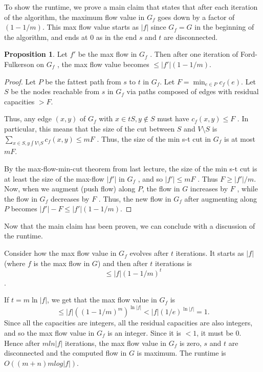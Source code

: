 \documentclass [12pt]{article}
\theoremstyle{definition}
\newtheorem{proposition}{Proposition}
\begin{document}
To show the runtime, we prove a main claim that states that after each iteration of the algorithm, the maximum flow value in $G_f$ goes down by a factor of $(1-1/m)$. This max flow value starts as $|f |$ since $G_f = G$ in the beginning of the algorithm, and ends at $0$ as in the end $s$ and $t$ are disconnected. 

\begin{proposition}
Let $f'$ be the max flow in $G_f$ . Then after one iteration of Ford-Fulkerson on $G_f$ , the max flow value becomes $\leq |f' |(1 - 1/m)$.
\end{proposition}


\begin{proof}

Let $P$ be the fattest path from $s$ to $t$ in $G_f$. Let $F = \min_{e \in P} c_f (e)$. Let $S$ be the nodes reachable from $s$ in $G_f$ via paths composed of edges with residual capacities $> F$.

Thus, any edge $(x, y )$ of $G_f$ with $x \in t S, y \notin S$ must have $c_f(x, y ) \leq F$ . In particular, this means that the size of the cut between $S$ and $V \setminus S$ is $\sum_{x \in S,y\int V \setminus S} c_f (x, y ) \leq mF$ . Thus, the size of the min s-t cut in $G_f$ is at most $mF$. 

By the max-flow-min-cut theorem from last lecture, the size of the min s-t cut is at least the size of the max-flow $|f' |$ in $G_f$ , and so $|f' | \leq mF$ . Thus $F \geq |f' |/m$. Now, when we augment (push flow) along $P$, the flow in $G$ increases by $F$ , while the flow in $G_f$ decreases by $F$ . Thus, the new flow in $G_f$ after augmenting along $P$ becomes $|f' | - F \leq |f' |(1 - 1/m)$. 
\end{proof}

Now that the main claim has been proven, we can conclude with a discussion of the runtime.

Consider how the max flow value in $G_f$ evolves after $t$ iterations. It starts as $|f |$ (where $f$ is the max flow in $G$) and then after $t$ iterations is $$
\leq |f | (1 - 1/m)^t
$$ . 

If $t = m \ln |f |$, we get that the max flow value in $G_f$ is 
$$
\leq |f | ((1 - 1/m)^m)^{\ln |f |} < |f |(1/e)^{\ln |f |} = 1.
$$
Since all the capacities are integers, all the residual capacities are also integers, and so the max flow value in $G_f$ is an integer. Since it is $< 1$, it must be $0$. Hence after $m ln |f |$ iterations, the max flow value in $G_f$ is zero, $s$ and $t$ are disconnected and the computed flow in $G$ is maximum. The runtime is $O((m + n)m log |f |)$.
\end{document}
